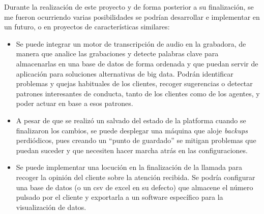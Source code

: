 \documentclass[a4paper, 12pt]{book}
\begin{document}
Durante la realización de este proyecto y de forma posterior a su finalización, se me fueron ocurriendo varias posibilidades se podrían desarrollar e implementar en un futuro, o en proyectos de características similares:
\begin{itemize}
  \item Se puede integrar un motor de transcripción de audio en la grabadora, de manera que analice las grabaciones y detecte palabras clave para almacenarlas en una base de datos de forma ordenada y que puedan servir de aplicación para soluciones alternativas de big data. Podrán identificar problemas y quejas habituales de los clientes, recoger sugerencias o detectar patrones interesantes de conducta, tanto de los clientes como de los agentes, y poder actuar en base a esos patrones.
  \item A pesar de que se realizó un salvado del estado de la platforma cuando se finalizaron los cambios, se puede desplegar una máquina que aloje \emph{backups} perdiódicos, pues creando un ``punto de guardado'' se mitigan problemas que puedan suceder y que necesiten hacer marcha atrás en las configuraciones.
  \item Se puede implementar una locución en la finalización de la llamada para recoger la opinión del cliente sobre la atención recibida. Se podría configurar una base de datos (o un csv de excel en su defecto) que almacene el número pulsado por el cliente y exportarla a un software específico para la visualización de datos.
\end{itemize}


\cleardoublepage


\end{document}
